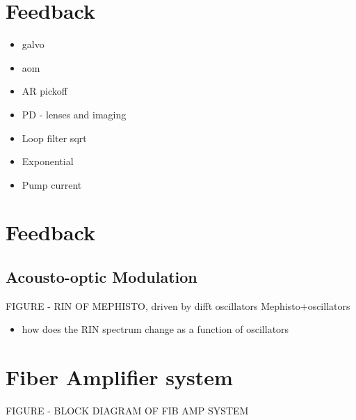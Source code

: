 \documentclass[twocolumn,aps,pra,showpacs,preprintnumbers,bibnotes]{revtex4-1}
\begin{document}
\section{Feedback}
\begin{itemize}
    \item galvo
    \item aom
    \item AR pickoff
    \item PD - lenses and imaging
    \item Loop filter sqrt
    \item Exponential
    \item Pump current
\end{itemize}



\section{Feedback}


\subsection{Acousto-optic Modulation}

FIGURE - RIN OF MEPHISTO, driven by difft oscillators
Mephisto+oscillators
\begin{itemize}
	\item how does the RIN spectrum change as a function of oscillators
\end{itemize}
\section{Fiber Amplifier system}
FIGURE - BLOCK DIAGRAM OF FIB AMP SYSTEM
\end{document}
